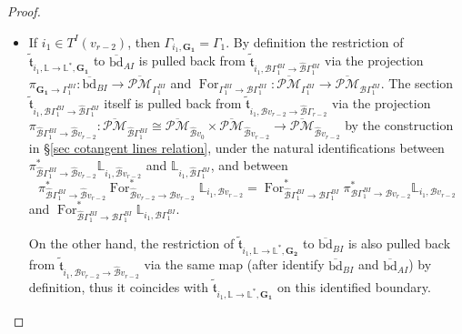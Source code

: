 \documentclass[11pt]{amsart}
\theoremstyle{definition}
\theoremstyle{remark}
\newcommand{\oPMb}{{\overline{\mathcal{PM}}}}
\newcommand{\<}{\left<}
\renewcommand{\>}{\right>}
\numberwithin{equation}{section}
\begin{document}
\begin{proof}
\begin{itemize}
        \item[-] If $i_1\in T^I(v_{r-2})$, then $\Gamma_{i_1,\mathbf{G_1}}=\Gamma_1$. By definition the restriction of $\tilde{\mathfrak{t}}_{i_1,\mathbb L \to \mathbb L^*,\mathbf{G_1}}$ to $\overline{\text{bd}}_{AI}$ is pulled back from 
        $\tilde{\mathfrak t}_{i_1,{\mathcal B}\Gamma_{1}^{BI}\to\hat{\mathcal B}\Gamma_{1}^{BI}}$ 
        via the projection $\pi_{\mathbf{G_1}\to \Gamma_1^{BI}}\colon \overline{\text{bd}}_{BI}\to \oPMb_{\Gamma_1^{BI}}$ and $\operatorname{For}_{\Gamma_{1}^{BI}\to \mathcal{B}\Gamma_{1}^{BI}}\colon \oPMb_{\Gamma_{1}^{BI}}\to \oPMb_{\mathcal{B}\Gamma_{1}^{BI}}$. The section 
        $\tilde{\mathfrak t}_{i_1,{\mathcal B}\Gamma_{1}^{BI}\to\hat{\mathcal B}\Gamma_{1}^{BI}}$ 
        itself is pulled back from $\tilde{\mathfrak t}_{i_1,{\mathcal B}v_{r-2}\to\hat{\mathcal B}\Gamma_{r-2}}$ via the %
projection $\pi_{\hat{\mathcal B}\Gamma_1^{BI}\to \hat{\mathcal B}v_{r-2}}\colon\oPMb_{\hat{\mathcal B}\Gamma_1^{BI}}\cong \oPMb_{\hat{\mathcal B}v_0}\times \oPMb_{\hat{\mathcal B}v_{r-2}}\to \oPMb_{\hat{\mathcal B}v_{r-2}}$ by %
the construction in \S \ref{sec cotangent lines relation}, under the natural identifications between $\pi^*_{\hat{\mathcal B} \Gamma_{1}^{BI}\to \hat{\mathcal B} v_{r-2}}\mathbb L_{i_1,\hat{\mathcal B} v_{r-2}}$ and $\mathbb L_{i_1,\hat{\mathcal B} \Gamma_{1}^{BI}}$, and between $$ \pi^*_{\hat{\mathcal B} \Gamma_{1}^{BI}\to \hat{\mathcal B} v_{r-2}} \operatorname{For}^*_{\hat{\mathcal B} v_{r-2} \to \mathcal B v_{r-2}} \mathbb L_{i_1,\mathcal B v_{r-2}}=\operatorname{For}^*_{\hat{\mathcal B} \Gamma_{1}^{BI} \to \mathcal B \Gamma_{1}^{BI}} \pi^*_{\mathcal B \Gamma_{1}^{BI}\to \mathcal B v_{r-2}}\mathbb L_{i_1,\mathcal B v_{r-2}}$$ and $\operatorname{For}^*_{\hat{\mathcal B} \Gamma_{1}^{BI} \to \mathcal B \Gamma_{1}^{BI}} \mathbb L_{i_1,\mathcal B \Gamma_{1}^{BI}}$. 

          On the other hand, the restriction of  $\tilde{\mathfrak{t}}_{i_1,\mathbb L \to \mathbb L^*,\mathbf{G_2}}$ to $\overline{\text{bd}}_{BI}$ is also pulled back from $\tilde{\mathfrak t}_{i_1,{\mathcal B}v_{r-2}\to\hat{\mathcal B}v_{r-2}}$ via the same map (after identify $\overline{\text{bd}}_{BI}$ and $\overline{\text{bd}}_{AI}$) by definition, thus it coincides with $\tilde{\mathfrak{t}}_{i_1,\mathbb L \to \mathbb L^*,\mathbf{G_1}}$ on this identified boundary.
          

\end{itemize}
\end{proof}
\end{document}
